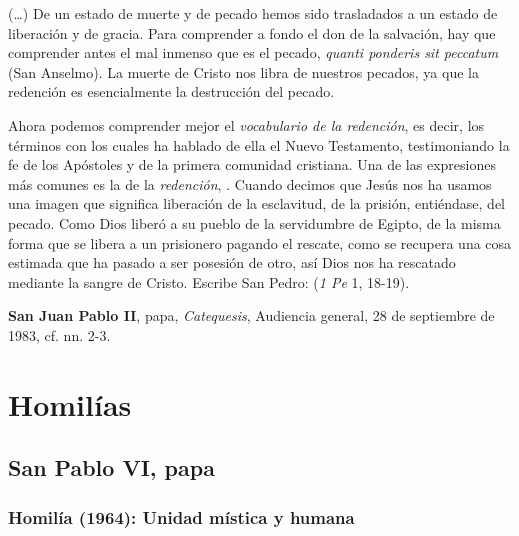 \begin{patercite}
(\ldots)  De un estado de muerte y de pecado hemos sido trasladados a un estado de liberación y de gracia. Para comprender a fondo el don de la salvación, hay que comprender antes el mal inmenso que es el pecado, \textit{quanti ponderis sit peccatum} (San Anselmo).  La muerte de Cristo nos libra de nuestros pecados, ya que la redención es esencialmente la destrucción del pecado.

Ahora podemos comprender mejor el \textit{vocabulario de la redención}, es decir, los términos con los cuales ha hablado de ella el Nuevo Testamento, testimoniando la fe de los Apóstoles y de la primera comunidad cristiana. Una de las expresiones más comunes es la de la \textit{redención}, . Cuando decimos que Jesús nos ha  usamos una imagen que significa liberación de la esclavitud, de la prisión, entiéndase, del pecado. Como Dios liberó a su pueblo de la servidumbre de Egipto, de la misma forma que se libera a un prisionero pagando el rescate, como se recupera una cosa estimada que ha pasado a ser posesión de otro, así Dios nos ha rescatado mediante la sangre de Cristo. Escribe San Pedro:  (\textit{1 Pe} 1, 18-19).

\textbf{San Juan Pablo II}, papa, \textit{Catequesis}, Audiencia general, 28 de septiembre de 1983, cf. nn. 2-3.
\end{patercite}

\newsection
\section{Homilías}

\subsection{San Pablo VI, papa}

\subsubsection{Homilía (1964): Unidad mística y humana}



